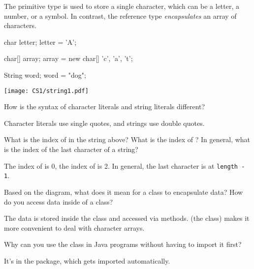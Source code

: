 

The primitive type  is used to store a single character, which can be a letter, a number, or a symbol.
In contrast, the reference type  \emph{encapsulates} an array of characters.

\begin{minipage}[t]{150pt}
\begin{javalst}
char letter;
letter = 'A';

char[] array;
array = new char[]
        {'c', 'a', 't'};

String word;
word = "dog";
\end{javalst}
\end{minipage}
\hfill
\begin{minipage}[t]{345pt}
\null
\texttt{[image: CS1/string1.pdf]}
\null
\end{minipage}




\Q How is the syntax of character literals and string literals different?

\begin{answer}
Character literals use single quotes, and strings use double quotes.
\end{answer}


\Q What is the index of  in the string above?
What is the index of ?
In general, what is the index of the last character of a string?

\begin{answer}
The index of  is 0, the index of  is 2.
In general, the last character is at {\tt length - 1}.
\end{answer}


\Q Based on the diagram, what does it mean for a class to encapsulate data?
How do you access data inside of a class?

\begin{answer}
The data is stored inside the class and accessed via methods.
 (the class) makes it more convenient to deal with character arrays.
\end{answer}


\Q Why can you use the  class in Java programs without having to import it first?

\begin{answer}
It's in the  package, which gets imported automatically.
\end{answer}


